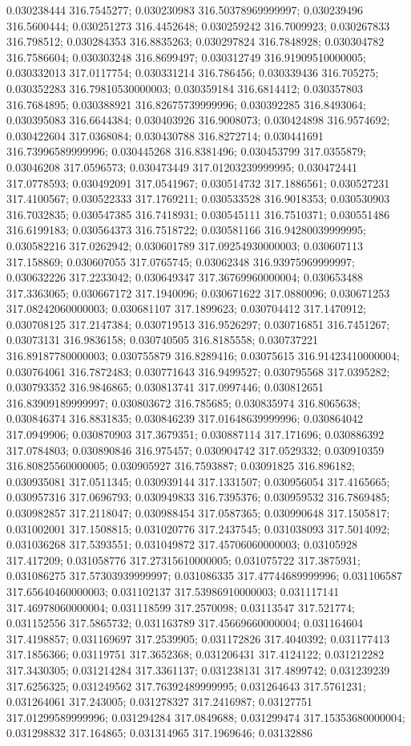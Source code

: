 0.030238444 316.7545277; 0.030230983 316.50378969999997; 0.030239496 316.5600444; 0.030251273 316.4452648; 0.030259242 316.7009923; 0.030267833 316.798512; 0.030284353 316.8835263; 0.030297824 316.7848928; 0.030304782 316.7586604; 0.030303248 316.8699497; 0.030312749 316.91909510000005; 0.030332013 317.0117754; 0.030331214 316.786456; 0.030339436 316.705275; 0.030352283 316.79810530000003; 0.030359184 316.6814412; 0.030357803 316.7684895; 0.030388921 316.82675739999996; 0.030392285 316.8493064; 0.030395083 316.6644384; 0.030403926 316.9008073; 0.030424898 316.9574692; 0.030422604 317.0368084; 0.030430788 316.8272714; 0.030441691 316.73996589999996; 0.030445268 316.8381496; 0.030453799 317.0355879; 0.03046208 317.0596573; 0.030473449 317.01203239999995; 0.030472441 317.0778593; 0.030492091 317.0541967; 0.030514732 317.1886561; 0.030527231 317.4100567; 0.030522333 317.1769211; 0.030533528 316.9018353; 0.030530903 316.7032835; 0.030547385 316.7418931; 0.030545111 316.7510371; 0.030551486 316.6199183; 0.030564373 316.7518722; 0.030581166 316.94280039999995; 0.030582216 317.0262942; 0.030601789 317.09254930000003; 0.030607113 317.158869; 0.030607055 317.0765745; 0.03062348 316.93975969999997; 0.030632226 317.2233042; 0.030649347 317.36769960000004; 0.030653488 317.3363065; 0.030667172 317.1940096; 0.030671622 317.0880096; 0.030671253 317.08242060000003; 0.030681107 317.1899623; 0.030704412 317.1470912; 0.030708125 317.2147384; 0.030719513 316.9526297; 0.030716851 316.7451267; 0.03073131 316.9836158; 0.030740505 316.8185558; 0.030737221 316.89187780000003; 0.030755879 316.8289416; 0.03075615 316.91423410000004; 0.030764061 316.7872483; 0.030771643 316.9499527; 0.030795568 317.0395282; 0.030793352 316.9846865; 0.030813741 317.0997446; 0.030812651 316.83909189999997; 0.030803672 316.785685; 0.030835974 316.8065638; 0.030846374 316.8831835; 0.030846239 317.01648639999996; 0.030864042 317.0949906; 0.030870903 317.3679351; 0.030887114 317.171696; 0.030886392 317.0784803; 0.030890846 316.975457; 0.030904742 317.0529332; 0.030910359 316.80825560000005; 0.030905927 316.7593887; 0.03091825 316.896182; 0.030935081 317.0511345; 0.030939144 317.1331507; 0.030956054 317.4165665; 0.030957316 317.0696793; 0.030949833 316.7395376; 0.030959532 316.7869485; 0.030982857 317.2118047; 0.030988454 317.0587365; 0.030990648 317.1505817; 0.031002001 317.1508815; 0.031020776 317.2437545; 0.031038093 317.5014092; 0.031036268 317.5393551; 0.031049872 317.45706060000003; 0.03105928 317.417209; 0.031058776 317.27315610000005; 0.031075722 317.3875931; 0.031086275 317.57303939999997; 0.031086335 317.47744689999996; 0.031106587 317.65640460000003; 0.031102137 317.53986910000003; 0.031117141 317.46978060000004; 0.031118599 317.2570098; 0.03113547 317.521774; 0.031152556 317.5865732; 0.031163789 317.45669660000004; 0.031164604 317.4198857; 0.031169697 317.2539905; 0.031172826 317.4040392; 0.031177413 317.1856366; 0.03119751 317.3652368; 0.031206431 317.4124122; 0.031212282 317.3430305; 0.031214284 317.3361137; 0.031238131 317.4899742; 0.031239239 317.6256325; 0.031249562 317.76392489999995; 0.031264643 317.5761231; 0.031264061 317.243005; 0.031278327 317.2416987; 0.03127751 317.01299589999996; 0.031294284 317.0849688; 0.031299474 317.15353680000004; 0.031298832 317.164865; 0.031314965 317.1969646; 0.03132886 
